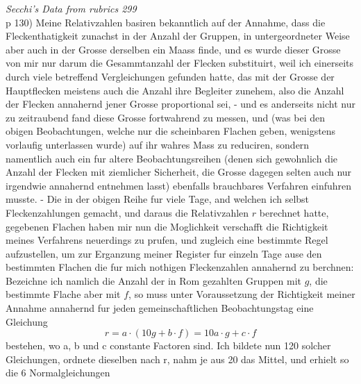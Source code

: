 \documentclass[12pt]{article}
\begin{document}
\textit{Secchi's Data from rubrics 299}\\

p 130) Meine Relativzahlen basiren bekanntlich auf der Annahme, dass die Fleckenthatigkeit zunachst in der Anzahl der Gruppen, in untergeordneter Weise aber auch in der Grosse derselben ein Maass finde, und es wurde dieser Grosse von mir nur darum die Gesammtanzahl der Flecken substituirt, weil ich einerseits durch viele betreffend Vergleichungen gefunden hatte, das mit der Grosse der Hauptflecken meistens auch die Anzahl ihre Begleiter zunehem, also die Anzahl der Flecken annahernd jener Grosse proportional sei, - und es anderseits nicht nur zu zeitraubend fand diese Grosse fortwahrend zu messen, und (was bei den obigen Beobachtungen, welche nur die scheinbaren Flachen geben, wenigstens vorlaufig unterlassen wurde) auf ihr wahres Mass zu reduciren, sondern namentlich auch ein fur altere Beobachtungsreihen (denen sich gewohnlich die Anzahl der Flecken mit ziemlicher Sicherheit, die Grosse dagegen selten auch nur irgendwie annahernd entnehmen lasst) ebenfalls brauchbares Verfahren einfuhren musste. - Die in der obigen Reihe fur viele Tage, and welchen ich selbst Fleckenzahlungen gemacht, und daraus die Relativzahlen $r$ berechnet hatte, gegebenen Flachen haben mir nun die Moglichkeit verschafft die Richtigkeit meines Verfahrens neuerdings zu prufen, und zugleich eine bestimmte Regel aufzustellen, um zur Erganzung meiner Register fur einzeln Tage ause den bestimmten Flachen die fur mich nothigen Fleckenzahlen annahernd zu berchnen: Bezeichne ich namlich die Anzahl der in Rom gezahlten Gruppen mit $g$, die bestimmte Flache aber mit $f$, so muss unter Voraussetzung der Richtigkeit meiner Annahme annahernd fur jeden gemeinschaftlichen Beobachtungstag eine Gleichung
$$r = a\cdot (10 g + b \cdot f) = 10 a \cdot g + c \cdot f$$
bestehen, wo a, b und c constante Factoren sind. Ich bildete nun 120 solcher Gleichungen, ordnete dieselben nach r, nahm je aus 20 das Mittel, und erhielt so die 6 Normalgleichungen \\
\end{document}
